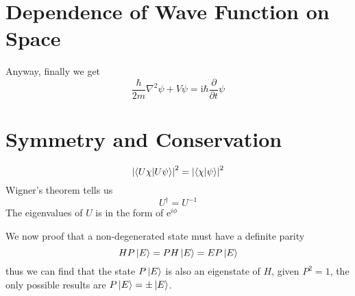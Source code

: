 \chapter[波函数对于空间的依赖]{Dependence of Wave Function on Space}
Anyway, finally we get 
\begin{equation}
  \frac{\hbar}{2m} \nabla^2 \psi + V \psi = \mathrm{i} \hbar \frac{\partial }{\partial t} \psi
\end{equation}

\chapter[对称性与守恒率]{Symmetry and Conservation}
\begin{equation}
  \left| \bra{U\chi} \ket{U\psi} \right| ^{2} = \left| \bra{\chi} \ket{\psi} \right| ^{2}
\end{equation}
Wigner's theorem tells us
\begin{equation}
  U^{\dagger} = U ^{-1}
\end{equation}
The eigenvalues of $U$ is in the form of $\mathrm{e}^{i\phi}$

We now proof that a non-degenerated state must have a definite parity 
\begin{equation}
  H P \ket{E} = P H \ket{E} = E P \ket{E}
\end{equation}
thus we can find that the state $P \ket{E}$ is also an eigenstate of $H$, given $P^{2} = 1$, the only possible results are $P \ket{E} = \pm \ket{E}$.